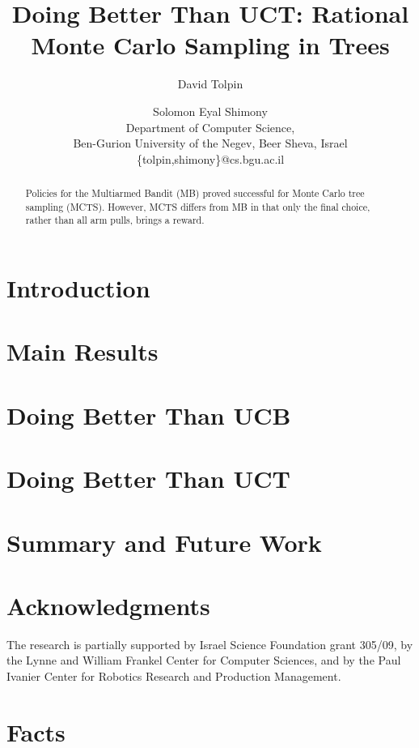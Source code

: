 \documentclass{article}
\title{Doing Better Than UCT: Rational Monte Carlo Sampling in Trees}
\author {David Tolpin \and Solomon Eyal Shimony \\
Department of Computer Science, \\
Ben-Gurion University of the Negev, Beer Sheva, Israel \\
\{tolpin,shimony\}@cs.bgu.ac.il}
\begin{document}
\maketitle

\begin{abstract}

Policies for the Multiarmed Bandit (MB) proved successful for Monte Carlo
tree sampling (MCTS). However, MCTS differs from MB in that only the
final choice, rather than all arm pulls, brings a reward. 

\end{abstract}


\section{Introduction}

\cite{Auer.ucb}

\section{Main Results}

\section{Doing Better Than UCB}

\section{Doing Better Than UCT}

\section{Summary and Future Work}

\section*{Acknowledgments}

The research is partially supported by Israel
Science Foundation grant 305/09, by the Lynne and William Frankel
Center for Computer Sciences, and by the Paul Ivanier Center for
Robotics Research and Production Management.




\pagebreak

\appendix

\section{Facts}
\end{document}
